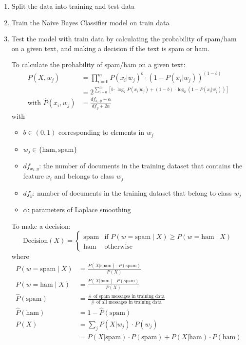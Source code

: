 \begin{enumerate}
    \item Split the data into training and test data
    \item Train the Naive Bayes Classifier model on train data
    \item Test the model with train data by calculating the probability of spam/ham on a given text, and making a decision if the text is spam or ham.
    
    To calculate the probability of spam/ham on a given text:
    \begin{align}
        P(X, w_j) &= \prod_{i=0}^{m} P(x_i | w_j)^b \cdot \left(1 - P(x_i | w_j)\right)^{(1-b)}\\
        &= 2^{\sum_{i=0}^{m} \left[ b \cdot \log_2 P(x_i | w_j) + (1-b) \cdot \log_2 \left(1 - P(x_i | w_j)\right) \right]}\\
        \text{with } \hat{P}(x_i, w_j) &= \frac{df_{x_i,y} + \alpha}{df_y + 2\alpha}
    \end{align}
    with 
    \begin{itemize}
        \item $b \in (0,1)$ corresponding to elements in $w_j$
        \item $w_j \in \{\text{ham}, \text{spam}\}$
        \item $df_{x_i,y}$: the number of documents in the training dataset that contains the feature $x_i$ and belongs to class $w_j$
        \item $df_y$: number of documents in the training dataset that belong to class $w_j$
        \item $\alpha$: parameters of Laplace smoothing
    \end{itemize}

    To make a decision:
    \begin{equation}
        \text{Decision}(X) = 
        \begin{cases}
            \text{spam} & \text{if } P(w = \text{spam} \mid X) \geq P(w = \text{ham} \mid X)\\
            \text{ham} & \text{otherwise}
        \end{cases}
    \end{equation}
    where
    \begin{align}
        P(w = \text{spam} \mid X) &= \frac{P(X | \text{spam}) \cdot P(\text{spam})}{P(X)}\\
        P(w = \text{ham} \mid X) &= \frac{P(X | \text{ham}) \cdot P(\text{spam})}{P(X)}\\
        \hat{P}(\text{spam}) &= \frac{\# \text{ of spam messages in training data}}{\# \text{ of all messages in training data}}\\
        \hat{P}(\text{ham}) &= 1 - \hat{P}(\text{spam})\\
        P(X) &= \sum_{j} P(X | w_j) \cdot P(w_j) \\
        &= P(X | \text{spam}) \cdot P(\text{spam}) + P(X | \text{ham}) \cdot P(\text{ham})
    \end{align}


\end{enumerate}
